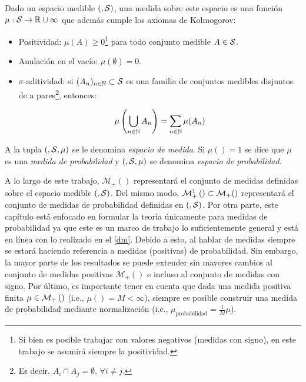 \begin{defn}[medida]
    \label{defn:measure}

    Dado un espacio medible $(,\mathcal{S})$, una medida sobre este espacio es una función $\mu:\mathcal{S}\to\mathbb{R}\cup{\infty}$ que además cumple los axiomas de Kolmogorov:

    \begin{itemize}
        \item Positividad: $\mu(A)\geq 0$\footnote{Si bien es posible trabajar con valores negativos (medidas con signo), en este trabajo se asumirá siempre la positividad.} para todo conjunto medible $A\in\mathcal{S}$.
        \item Anulación en el vacío: $\mu(\emptyset) = 0$.
        \item $\sigma$-aditividad: si $(A_n)_{n\in\mathbb{N}}\subset\mathcal{S}$ es una familia de conjuntos medibles disjuntos de a pares\footnote{Es decir, $A_i\cap A_j = \emptyset,\,\forall i\neq j$.}, entonces:

            \begin{equation*}
                \mu\left(\bigcup_{n\in\mathbb{N}} A_n\right) = \sum_{n\in\mathbb{N}} \mu(A_n)
            \end{equation*}

    \end{itemize}

    A la tupla $(,\mathcal{S},\mu)$ se le denomina \textit{espacio de medida}. Si $\mu(\xspace)=1$ se dice que $\mu$ es una \textit{medida de probabilidad} y $(,\mathcal{S},\mu)$ se denomina \textit{espacio de probabilidad}.
\end{defn}

A lo largo de este trabajo, $\mathcal{M}_+(\xspace)$ representará el conjunto de medidas definidas sobre el espacio medible $(,\mathcal{S})$. Del mismo modo, $\mathcal{M}_+^1\left(\right)\subset\mathcal{M}_+()$ representará el conjunto de medidas de probabilidad definidas en $(,\mathcal{S})$. Por otra parte, este capítulo está enfocado en formular la teoría únicamente para medidas de probabilidad ya que este es un marco de trabajo lo suficientemente general y está en línea con lo realizado en el \autoref{dm}. Debido a esto, al hablar de medidas siempre se estará haciendo referencia a medidas (positivas) de probabilidad. Sin embargo, la mayor parte de los resultados se puede extender sin mayores cambios al conjunto de medidas positivas $\mathcal{M}_+(\xspace)$ e incluso al conjunto de medidas con signo. Por último, es importante tener en cuenta que dada una medida positiva finita $\mu\in\mathcal{M}_+\left(\right)$ (i.e., $\mu(\xspace)=M<\infty$), siempre es posible construir una medida de probabilidad mediante normalización (i.e., $\mu_{\operatorname{probabilidad}} = \frac{1}{M}\mu$).

